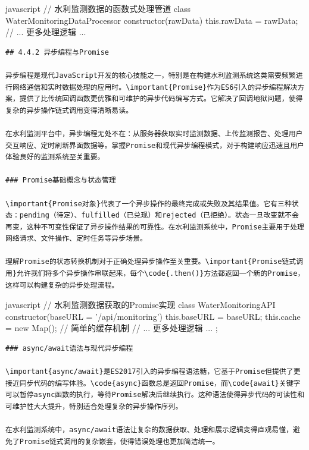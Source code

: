 {{{\begin{lstlisting}
\end{lstlisting}javascript
// 水利监测数据的函数式处理管道
class WaterMonitoringDataProcessor {
    constructor(rawData) {
        this.rawData = rawData;
    }
    // ... 更多处理逻辑 ...
        }
    }
}
\begin{lstlisting}
## 4.4.2 异步编程与Promise

异步编程是现代JavaScript开发的核心技能之一，特别是在构建水利监测系统这类需要频繁进行网络通信和实时数据处理的应用时。\important{Promise}作为ES6引入的异步编程解决方案，提供了比传统回调函数更优雅和可维护的异步代码编写方式。它解决了回调地狱问题，使得复杂的异步操作链式调用变得清晰易读。

在水利监测平台中，异步编程无处不在：从服务器获取实时监测数据、上传监测报告、处理用户交互响应、定时刷新界面数据等。掌握Promise和现代异步编程模式，对于构建响应迅速且用户体验良好的监测系统至关重要。

### Promise基础概念与状态管理

\important{Promise对象}代表了一个异步操作的最终完成或失败及其结果值。它有三种状态：pending（待定）、fulfilled（已兑现）和rejected（已拒绝）。状态一旦改变就不会再变，这种不可变性保证了异步操作结果的可靠性。在水利监测系统中，Promise主要用于处理网络请求、文件操作、定时任务等异步场景。

理解Promise的状态转换机制对于正确处理异步操作至关重要。\important{Promise链式调用}允许我们将多个异步操作串联起来，每个\code{.then()}方法都返回一个新的Promise，这样可以构建复杂的异步处理流程。

\end{lstlisting}javascript
// 水利监测数据获取的Promise实现
class WaterMonitoringAPI {
    constructor(baseURL = '/api/monitoring') {
        this.baseURL = baseURL;
        this.cache = new Map(); // 简单的缓存机制
    // ... 更多处理逻辑 ...
        };
    }
}

\begin{lstlisting}
### async/await语法与现代异步编程

\important{async/await}是ES2017引入的异步编程语法糖，它基于Promise但提供了更接近同步代码的编写体验。\code{async}函数总是返回Promise，而\code{await}关键字可以暂停async函数的执行，等待Promise解决后继续执行。这种语法使得异步代码的可读性和可维护性大大提升，特别适合处理复杂的异步操作序列。

在水利监测系统中，async/await语法让复杂的数据获取、处理和展示逻辑变得直观易懂，避免了Promise链式调用的复杂嵌套，使得错误处理也更加简洁统一。

\end{lstlisting}

